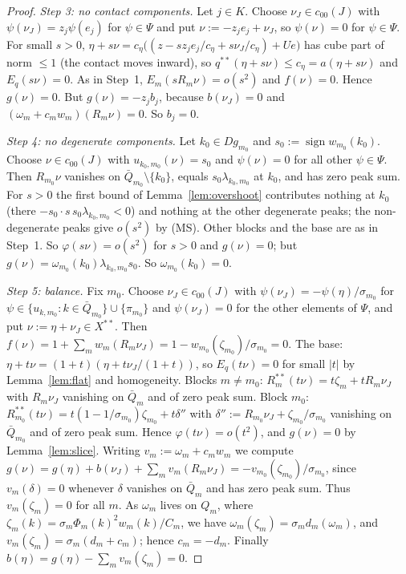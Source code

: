 \documentclass[10pt]{amsart}
\theoremstyle{definition}
\theoremstyle{remark}
\newcommand{\sgn}{\operatorname{sign}}
\begin{document}
\begin{proof}
\emph{Step 3: no contact components.}  Let $j\in K$.  Choose
$\nu_J\in c_{00}(J)$ with $\psi(\nu_J)=z_j\psi(e_j)$ for $\psi\in\Psi$ and
put $\nu:=-z_je_j+\nu_J$, so $\psi(\nu)=0$ for $\psi\in\Psi$.  For small
$s>0$, $\eta+s\nu=c_\eta\big((z-sz_je_j/c_\eta+s\nu_J/c_\eta)+Ue\big)$ has
cube part of norm $\le1$ (the contact moves inward), so
$q^{**}(\eta+s\nu)\le c_\eta=a(\eta+s\nu)$ and $E_q(s\nu)=0$.  As in
Step~1, $E_m(sR_m\nu)=o(s^2)$ and $f(\nu)=0$.  Hence $g(\nu)=0$.  But
$g(\nu)=-z_jb_j$, because $b(\nu_J)=0$ and
$(\omega_m+c_mw_m)(R_m\nu)=0$.  So $b_j=0$.

\emph{Step 4: no degenerate components.}  Let $k_0\in Dg_{m_0}$ and
$s_0:=\sgn w_{m_0}(k_0)$.  Choose $\nu\in c_{00}(J)$ with
$u_{k_0,m_0}(\nu)=s_0$ and $\psi(\nu)=0$ for all other $\psi\in\Psi$.  Then
$R_{m_0}\nu$ vanishes on $\bar Q_{m_0}\setminus\{k_0\}$, equals
$s_0\lambda_{k_0,m_0}$ at $k_0$, and has zero peak sum.  For $s>0$ the
first bound of Lemma~\ref{lem:overshoot} contributes nothing at $k_0$
(there $-s_0\cdot s\,s_0\lambda_{k_0,m_0}<0$) and nothing at the other
degenerate peaks; the non-degenerate peaks give $o(s^2)$ by (MS).  Other
blocks and the base are as in Step~1.  So $\varphi(s\nu)=o(s^2)$ for
$s>0$ and $g(\nu)=0$; but
$g(\nu)=\omega_{m_0}(k_0)\lambda_{k_0,m_0}s_0$.  So $\omega_{m_0}(k_0)=0$.

\emph{Step 5: balance.}  Fix $m_0$.  Choose $\nu_J\in c_{00}(J)$ with
$\psi(\nu_J)=-\psi(\eta)/\sigma_{m_0}$ for $\psi\in\{u_{k,m_0}:k\in\bar
Q_{m_0}\}\cup\{\pi_{m_0}\}$ and $\psi(\nu_J)=0$ for the other elements of
$\Psi$, and put $\nu:=\eta+\nu_J\in X^{**}$.  Then
$f(\nu)=1+\sum_mw_m(R_m\nu_J)=1-w_{m_0}(\zeta_{m_0})/\sigma_{m_0}=0$.  The
base: $\eta+t\nu=(1+t)(\eta+t\nu_J/(1+t))$, so $E_q(t\nu)=0$ for small
$|t|$ by Lemma~\ref{lem:flat} and homogeneity.  Blocks $m\ne m_0$:
$R_m^{**}(t\nu)=t\zeta_m+tR_m\nu_J$ with $R_m\nu_J$ vanishing on $\bar Q_m$
and of zero peak sum.  Block $m_0$: $R^{**}_{m_0}(t\nu)=t(1-1/\sigma_{m_0})
\zeta_{m_0}+t\delta''$ with $\delta'':=R_{m_0}\nu_J+\zeta_{m_0}/\sigma_{m_0}$
vanishing on $\bar Q_{m_0}$ and of zero peak sum.  Hence $\varphi(t\nu)=
o(t^2)$, and $g(\nu)=0$ by Lemma~\ref{lem:slice}.  Writing
$v_m:=\omega_m+c_mw_m$ we compute $g(\nu)=g(\eta)+b(\nu_J)+\sum_m
v_m(R_m\nu_J)=-v_{m_0}(\zeta_{m_0})/\sigma_{m_0}$, since $v_m(\delta)=0$
whenever $\delta$ vanishes on $\bar Q_m$ and has zero peak sum.  Thus
$v_m(\zeta_m)=0$ for all $m$.  As $\omega_m$ lives on $Q_m$, where
$\zeta_m(k)=\sigma_m\Phi_m(k)^2w_m(k)/C_m$, we have
$\omega_m(\zeta_m)=\sigma_md_m(\omega_m)$, and $v_m(\zeta_m)=\sigma_m(d_m+
c_m)$; hence $c_m=-d_m$.  Finally $b(\eta)=g(\eta)-\sum_mv_m(\zeta_m)=0$.
\end{proof}
\end{document}

